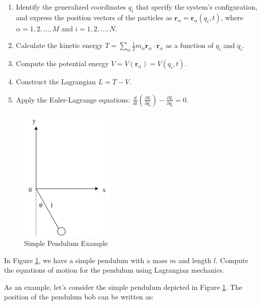 \begin{enumerate}
    \item Identify the generalized coordinates $q_i$ that specify the system's 
    configuration, and express the position vectors of the particles as 
    $\mathbf{r}_\alpha=\mathbf{r}_\alpha(q_i, t)$, where $\alpha = 1, 2, \dots, M$ and 
    $i = 1, 2, \dots, N$.
    \item Calculate the kinetic energy 
    $T = \sum_\alpha \frac{1}{2} m_\alpha \dot{\mathbf{r}}_\alpha \cdot \dot{\mathbf{r}}_\alpha$ 
    as a function of $q_i$ and $\dot{q}_i$.
    \item Compute the potential energy $V = V(\mathbf{r}_\alpha) = V(q_i, t)$.
    \item Construct the Lagrangian $L = T - V$.
    \item Apply the Euler-Lagrange equations: 
    $\frac{d}{dt} \left(\frac{\partial L}{\partial \dot{q}_i}\right) - \frac{\partial L}{\partial q_i} = 0$.
\end{enumerate}

\begin{figure}[ht]
    \centering
    \includegraphics[width=0.4\textwidth]{images/2-1-1.png}
    \caption{Simple Pendulum Example}
    \label{fig:2-1-1}
\end{figure}

\begin{example}
    In Figure \ref{fig:2-1-1}, we have a simple pendulum with a mass $m$ and length $l$.
    Compute the equations of motion for the pendulum using Lagrangian mechanics.
    \label{ex:2-1}
\end{example}

As an example, let's consider the simple pendulum depicted in Figure \ref{fig:2-1-1}. 
The position of the pendulum bob can be written as:

